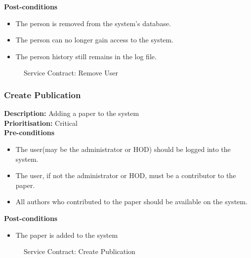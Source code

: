 \documentclass[a4paper]{article}
\begin{document}
        \textbf{Post-conditions}
        \begin{itemize}
            \item The person is removed from the system's database.
            \item The person can no longer gain access to the system.
            \item The person history still remains in the log file.
        \end{itemize}

        	\begin{figure}[H]
        		\centering
        		\caption{Service Contract: Remove User}
        	\end{figure}
        \pagebreak
    \subsubsection{Create Publication}
        
        \textbf{Description:} Adding a paper to the system\\
        \textbf{Prioritisation:} Critical\\
        
        
        \textbf{Pre-conditions}
         \begin{itemize}
            \item The user(may be the administrator or HOD) should be logged into the system.
            \item The user, if not the administrator or HOD, must be a contributor to the paper.
            \item All authors who contributed to the paper should be available on the system.
       \end{itemize}
        
        \textbf{Post-conditions}
        \begin{itemize}
            \item The paper is added to the system
        \end{itemize}
        
            	\begin{figure}[H]
            		\centering
            		\caption{Service Contract: Create Publication}
            	\end{figure}
        \pagebreak
\end{document}

